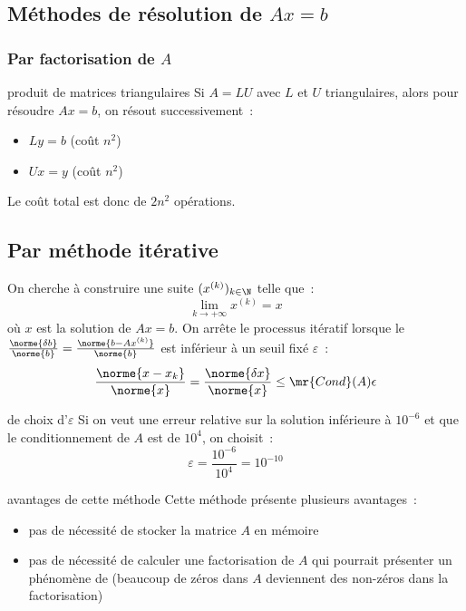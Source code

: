 \subsection{Méthodes de résolution de $Ax = b$}

\subsubsection{Par factorisation de $A$}

\begin{exemple}{}{produit de matrices triangulaires}
    Si $A = LU$  avec $L$ et $U$ triangulaires, alors pour résoudre $Ax = b$, on résout successivement~:
    \begin{itemize}
        \item $Ly = b$ (coût $n^2$)
        \item $Ux = y$ (coût $n^2$)
    \end{itemize}
    Le coût total est donc de $2n^2$ opérations.
\end{exemple}

\subsection{Par méthode itérative}
On cherche à construire une suite $(x^{(k)})_{k\in\N}$ telle que~:
$$\lim_{k \to +\infty} x^{(k)} = x$$
où $x$ est la solution de $Ax = b$. On arrête le processus itératif lorsque le  $\frac{\norme{\delta b }}{\norme{b}}= \frac{\norme{b - A x^{(k)}}}{\norme{b}}$ est inférieur à un seuil fixé $\varepsilon$~:
$$\frac{\norme{x-x_k}}{\norme{x}} = \frac{\norme{\delta x}}{\norme{x}} \leq \mr{Cond}(A)\epsilon$$

\begin{exemple}{}{de choix d'$\varepsilon$}
    Si on veut une erreur relative sur la solution inférieure à $10^{-6}$ et que le conditionnement de $A$ est de $10^4$, on choisit~:
    $$\varepsilon = \frac{10^{-6}}{10^4} = 10^{-10}$$
\end{exemple}

\begin{remarque}{}{avantages de cette méthode}
    Cette méthode présente plusieurs avantages~:
    \begin{itemize}
        \item pas de nécessité de stocker la matrice $A$ en mémoire
        \item pas de nécessité de calculer une factorisation de $A$ qui pourrait présenter un phénomène de  (beaucoup de zéros dans $A$ deviennent des non-zéros dans la factorisation)
    \end{itemize}
\end{remarque}

